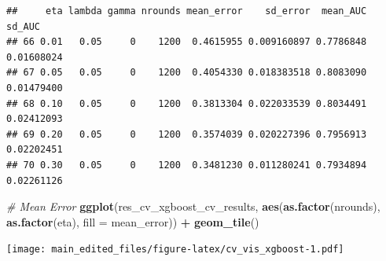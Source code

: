 \documentclass[
]{article}
\newenvironment{Shaded}{\begin{snugshade}}{\end{snugshade}}
\newcommand{\CommentTok}[1]{\textcolor[rgb]{0.56,0.35,0.01}{\textit{#1}}}
\newcommand{\DataTypeTok}[1]{\textcolor[rgb]{0.13,0.29,0.53}{#1}}
\newcommand{\DecValTok}[1]{\textcolor[rgb]{0.00,0.00,0.81}{#1}}
\newcommand{\FloatTok}[1]{\textcolor[rgb]{0.00,0.00,0.81}{#1}}
\newcommand{\KeywordTok}[1]{\textcolor[rgb]{0.13,0.29,0.53}{\textbf{#1}}}
\newcommand{\NormalTok}[1]{#1}
\newcommand{\OperatorTok}[1]{\textcolor[rgb]{0.81,0.36,0.00}{\textbf{#1}}}
\newcommand{\StringTok}[1]{\textcolor[rgb]{0.31,0.60,0.02}{#1}}
\begin{document}
\begin{Shaded}
\end{Shaded}

\begin{verbatim}
##     eta lambda gamma nrounds mean_error    sd_error  mean_AUC     sd_AUC
## 66 0.01   0.05     0    1200  0.4615955 0.009160897 0.7786848 0.01608024
## 67 0.05   0.05     0    1200  0.4054330 0.018383518 0.8083090 0.01479400
## 68 0.10   0.05     0    1200  0.3813304 0.022033539 0.8034491 0.02412093
## 69 0.20   0.05     0    1200  0.3574039 0.020227396 0.7956913 0.02202451
## 70 0.30   0.05     0    1200  0.3481230 0.011280241 0.7934894 0.02261126
\end{verbatim}

\begin{Shaded}
\begin{Highlighting}[]
\CommentTok{# Mean Error}
\KeywordTok{ggplot}\NormalTok{(res_cv_xgboost_cv_results, }\KeywordTok{aes}\NormalTok{(}\KeywordTok{as.factor}\NormalTok{(nrounds), }\KeywordTok{as.factor}\NormalTok{(eta), }\DataTypeTok{fill =}\NormalTok{ mean_error)) }\OperatorTok{+}\StringTok{ }
\StringTok{  }\KeywordTok{geom_tile}\NormalTok{()}
\end{Highlighting}
\end{Shaded}

\texttt{[image: main\_edited\_files/figure-latex/cv\_vis\_xgboost-1.pdf]}
\end{document}
